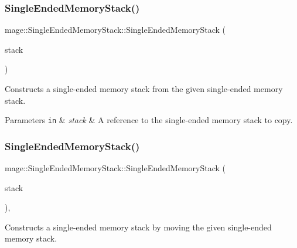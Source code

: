 \subsubsection{\texorpdfstring{Single\+Ended\+Memory\+Stack()}{SingleEndedMemoryStack()}\hspace{0.1cm}{\footnotesize\ttfamily [2/3]}}
{\footnotesize\ttfamily mage\+::\+Single\+Ended\+Memory\+Stack\+::\+Single\+Ended\+Memory\+Stack (\begin{DoxyParamCaption}\item[{const \hyperlink{classmage_1_1_single_ended_memory_stack}{Single\+Ended\+Memory\+Stack} \&}]{stack }\end{DoxyParamCaption})\hspace{0.3cm}{\ttfamily [delete]}}

Constructs a single-\/ended memory stack from the given single-\/ended memory stack.


\begin{DoxyParams}[1]{Parameters}
\mbox{\tt in}  & {\em stack} & A reference to the single-\/ended memory stack to copy. \\
\hline
\end{DoxyParams}
\hypertarget{classmage_1_1_single_ended_memory_stack_afd6632eac3ada6ea88a69b586f27a4e4}{}\label{classmage_1_1_single_ended_memory_stack_afd6632eac3ada6ea88a69b586f27a4e4} 
\subsubsection{\texorpdfstring{Single\+Ended\+Memory\+Stack()}{SingleEndedMemoryStack()}\hspace{0.1cm}{\footnotesize\ttfamily [3/3]}}
{\footnotesize\ttfamily mage\+::\+Single\+Ended\+Memory\+Stack\+::\+Single\+Ended\+Memory\+Stack (\begin{DoxyParamCaption}\item[{\hyperlink{classmage_1_1_single_ended_memory_stack}{Single\+Ended\+Memory\+Stack} \&\&}]{stack }\end{DoxyParamCaption})\hspace{0.3cm}{\ttfamily [default]}, {\ttfamily [noexcept]}}

Constructs a single-\/ended memory stack by moving the given single-\/ended memory stack.


